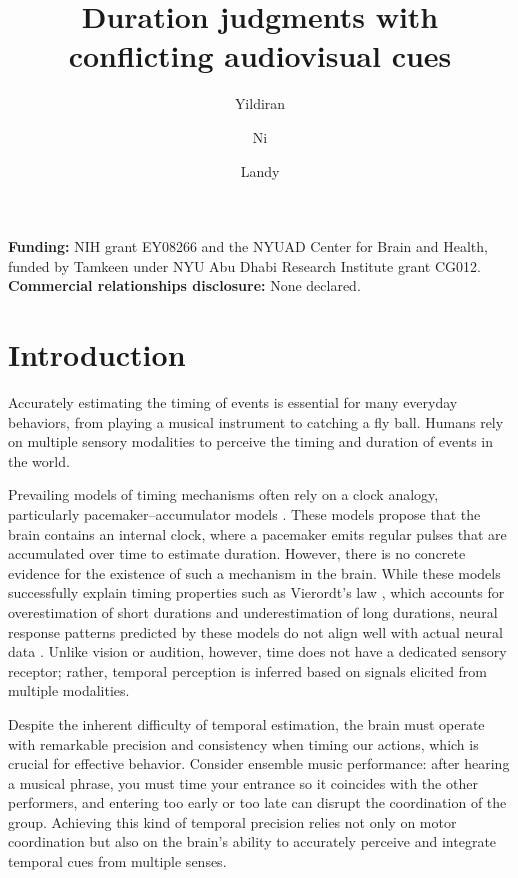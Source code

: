 \documentclass{jov}
\title{Duration judgments with conflicting audiovisual cues}
\author{Yildiran}{\"{O}mer F.}{Department of Psychology, New York University}{New York, NY, USA}{}{omer.yildiran@nyu.edu}
\author{Ni}{Long}{Department of Psychology and Center for Neural Science, New York University}{New York, NY, USA}{}{}
\author{Landy}{Michael S.}{Department of Psychology and Center for Neural Science, New York University}{New York, NY, USA}{}{}
\providecommand{\citep}[1]{\cite{#1}}
\begin{document}
\maketitle

\noindent\textbf{Funding:} NIH grant EY08266 and the NYUAD Center for Brain and Health, funded by Tamkeen under NYU Abu Dhabi Research Institute grant CG012.\\
\textbf{Commercial relationships disclosure:} None declared.


\section{Introduction}

Accurately estimating the timing of events is essential for many everyday behaviors, from playing a musical instrument to catching a fly ball. Humans rely on multiple sensory modalities to perceive the timing and duration of events in the world. 

Prevailing models of timing mechanisms often rely on a clock analogy, particularly pacemaker--accumulator models \citep{treisman1963temporal,gibbon1977scalar,wittmann2009inner,grondin2014non,hartcher2016single,grondin2025perception}. These models propose that the brain contains an internal clock, where a pacemaker emits regular pulses that are accumulated over time to estimate duration. However, there is no concrete evidence for the existence of such a mechanism in the brain. While these models successfully explain timing properties such as Vierordt's law \citep{lejeune2009vierordt,jazayeri2010temporal,mamassian2010s}, which accounts for overestimation of short durations and underestimation of long durations, neural response patterns predicted by these models do not align well with actual neural data \citep{buonomano2010population,muller2014perceiving,kononowicz2016search}. 
Unlike vision or audition, however, time does not have a dedicated sensory receptor; rather, temporal perception is inferred based on signals elicited from multiple modalities.

Despite the inherent difficulty of temporal estimation, the brain must operate with remarkable precision and consistency when timing our actions, which is crucial for effective behavior. Consider ensemble music performance: after hearing a musical phrase, you must time your entrance so it coincides with the other performers, and entering too early or too late can disrupt the coordination of the group. Achieving this kind of temporal precision relies not only on motor coordination but also on the brain's ability to accurately perceive and integrate temporal cues from multiple senses.
\end{document}
